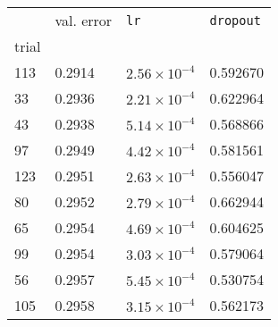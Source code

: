 \begin{tabular}{lp{2.3cm}p{2.3cm}p{2.3cm}}
\toprule
{} &  val. error &         \texttt{lr} &  \texttt{dropout} \\
trial &             &                     &                   \\
\midrule
113   &      0.2914 & $2.56\times10^{-4}$ &          0.592670 \\
33    &      0.2936 & $2.21\times10^{-4}$ &          0.622964 \\
43    &      0.2938 & $5.14\times10^{-4}$ &          0.568866 \\
97    &      0.2949 & $4.42\times10^{-4}$ &          0.581561 \\
123   &      0.2951 & $2.63\times10^{-4}$ &          0.556047 \\
80    &      0.2952 & $2.79\times10^{-4}$ &          0.662944 \\
65    &      0.2954 & $4.69\times10^{-4}$ &          0.604625 \\
99    &      0.2954 & $3.03\times10^{-4}$ &          0.579064 \\
56    &      0.2957 & $5.45\times10^{-4}$ &          0.530754 \\
105   &      0.2958 & $3.15\times10^{-4}$ &          0.562173 \\
\bottomrule
\end{tabular}
